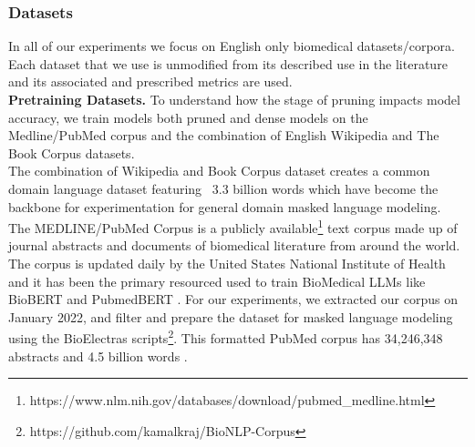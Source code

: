 \subsubsection{Datasets}
In all of our experiments we focus on English only biomedical datasets/corpora. Each dataset that we use is unmodified from its described use in the literature and its associated and prescribed metrics are used.\\
\textbf{Pretraining Datasets.} To understand how the stage of pruning impacts model accuracy, we train models both pruned and dense models on the Medline/PubMed corpus and the combination of English Wikipedia \cite{wikidump} and The Book Corpus \cite{Zhu_2015_ICCV} datasets. \\
The combination of Wikipedia and Book Corpus dataset creates a common domain language dataset featuring ~3.3 billion words which have become the backbone for experimentation for general domain masked language modeling. \\
The MEDLINE/PubMed Corpus is a publicly available\footnote{https://www.nlm.nih.gov/databases/download/pubmed\_medline.html} text corpus made up of journal abstracts and documents of biomedical literature from around the world. The corpus is updated daily by the United States National Institute of Health and it has been the primary resourced used to train BioMedical LLMs like BioBERT \cite{Lee2020BioBERTAP} and PubmedBERT \cite{Gu2022DomainSpecificLM}. For our experiments, we extracted our corpus on January 2022, and filter and prepare the dataset for masked language modeling using the BioElectras \cite{Kanakarajan2021BioELECTRAPretrainedBT} scripts\footnote{https://github.com/kamalkraj/BioNLP-Corpus}. This formatted PubMed corpus has 34,246,348 abstracts and 4.5 billion words \cite{Kanakarajan2021BioELECTRAPretrainedBT}. \\
